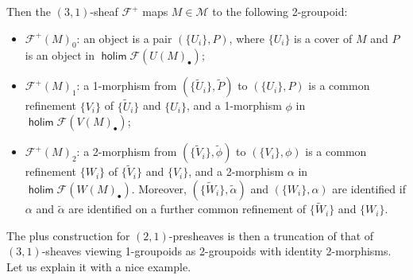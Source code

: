 \documentclass[letterpaper,10pt, oneside]{article} %
\newcommand{\Cat}{\mathcal M}%
\DeclareMathOperator{\holim}{\mathsf{holim}}
\newcommand{\huaF}{\mathcal{F}}
\begin{document}
Then the $(3,1)$-sheaf $\huaF^+$ maps $M \in \Cat$ to the following
2-groupoid:
\begin{itemize}
\item $\huaF^+(M)_0$: an object is a pair $(\{U_i\}, P)$, where
  $\{U_i\}$ is a cover of $M$ and $P$ is an object in $\holim \huaF (U(M)_\bullet)$;
\item $\huaF^+(M)_1$: a 1-morphism from $(\{\widetilde{U}_i\}, \widetilde{P})$ to $(\{U_i\},
  P)$ is a common refinement $\{V_i\}$ of $\{\widetilde{U}_i\}$ and $\{U_i\}$,
  and a
  1-morphism $\phi $ in $\holim \huaF (V(M)_\bullet)$;
\item $\huaF^+(M)_2$: a 2-morphism from $(\{\widetilde{V}_i\}, \widetilde{\phi})$ to $(\{V_i\},
  \phi)$ is a common refinement $\{W_i\}$ of $\{\widetilde{V}_i\}$ and $\{V_i\}$, and
  a 2-morphism $\alpha$ in $\holim \huaF (W(M)_\bullet)$. Moreover,  $(\{\widetilde{W}_i\}, \widetilde{\alpha})$ and $(\{W_i\},
  \alpha)$ are identified if $\alpha$ and $\widetilde{\alpha}$ are
  identified on a further common refinement of $\{\widetilde{W}_i\}$ and $\{W_i\}$.
\end{itemize}

The plus construction for $(2, 1)$-presheaves is then a truncation of that of
$(3, 1)$-sheaves viewing 1-groupoids as 2-groupoids with identity
2-morphisms. Let us explain it with a nice example.
\end{document}
